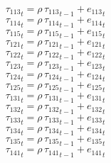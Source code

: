 \begin{dmath}
{{\tau_{113}}}_{t}={{\rho}}\, {{\tau_{113}}}_{t-1}+{{e_{113}}}_{t}
\end{dmath}
\begin{dmath}
{{\tau_{114}}}_{t}={{\rho}}\, {{\tau_{114}}}_{t-1}+{{e_{114}}}_{t}
\end{dmath}
\begin{dmath}
{{\tau_{115}}}_{t}={{\rho}}\, {{\tau_{115}}}_{t-1}+{{e_{115}}}_{t}
\end{dmath}
\begin{dmath}
{{\tau_{121}}}_{t}={{\rho}}\, {{\tau_{121}}}_{t-1}+{{e_{121}}}_{t}
\end{dmath}
\begin{dmath}
{{\tau_{122}}}_{t}={{\rho}}\, {{\tau_{122}}}_{t-1}+{{e_{122}}}_{t}
\end{dmath}
\begin{dmath}
{{\tau_{123}}}_{t}={{\rho}}\, {{\tau_{123}}}_{t-1}+{{e_{123}}}_{t}
\end{dmath}
\begin{dmath}
{{\tau_{124}}}_{t}={{\rho}}\, {{\tau_{124}}}_{t-1}+{{e_{124}}}_{t}
\end{dmath}
\begin{dmath}
{{\tau_{125}}}_{t}={{\rho}}\, {{\tau_{125}}}_{t-1}+{{e_{125}}}_{t}
\end{dmath}
\begin{dmath}
{{\tau_{131}}}_{t}={{\rho}}\, {{\tau_{131}}}_{t-1}+{{e_{131}}}_{t}
\end{dmath}
\begin{dmath}
{{\tau_{132}}}_{t}={{\rho}}\, {{\tau_{132}}}_{t-1}+{{e_{132}}}_{t}
\end{dmath}
\begin{dmath}
{{\tau_{133}}}_{t}={{\rho}}\, {{\tau_{133}}}_{t-1}+{{e_{133}}}_{t}
\end{dmath}
\begin{dmath}
{{\tau_{134}}}_{t}={{\rho}}\, {{\tau_{134}}}_{t-1}+{{e_{134}}}_{t}
\end{dmath}
\begin{dmath}
{{\tau_{135}}}_{t}={{\rho}}\, {{\tau_{135}}}_{t-1}+{{e_{135}}}_{t}
\end{dmath}
\begin{dmath}
{{\tau_{141}}}_{t}={{\rho}}\, {{\tau_{141}}}_{t-1}+{{e_{141}}}_{t}
\end{dmath}
